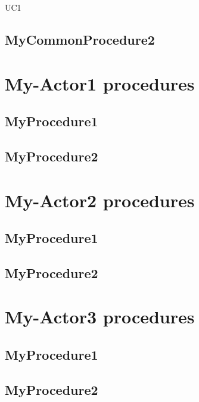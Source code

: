 \begin{lyxlist}{UC1}
\end{lyxlist}

\subsection{MyCommonProcedure2}


\section{My-Actor1 procedures}

\subsection{MyProcedure1}

\subsection{MyProcedure2}




\section{My-Actor2 procedures}
\subsection{MyProcedure1}
\subsection{MyProcedure2}


\section{My-Actor3 procedures}

\subsection{MyProcedure1}
\subsection{MyProcedure2}















